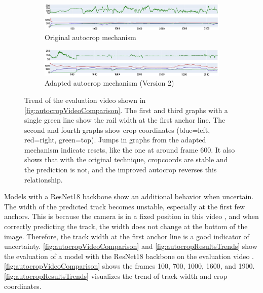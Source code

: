 \begin{figure}[H]
    \centering
    \begin{subfigure}{\textwidth}
        \centering
        \includegraphics[width=\textwidth]{PICs/experiments/autocropExperiments/original_updated.jpg} %
        \caption{Original autocrop mechanism}
        \label{fig:autocropResultsTrends_a}
    \end{subfigure}
    \begin{subfigure}{\textwidth}
        \centering
        \includegraphics[width=\textwidth]{PICs/experiments/autocropExperiments/improved_updated.jpg} %
        \caption{Adapted autocrop mechanism (Version 2)}
        \label{fig:autocropResultsTrends_b}
    \end{subfigure}
    \caption{Trend of the evaluation video \cite{temporalDataset_youtube_video} shown in \autoref{fig:autocropVideoComparison}.
    The first and third graphs with a single green line show the rail width at the first anchor line.
    The second and fourth graphs show crop coordinates (blue=left, red=right, green=top).
    Jumps in graphs from the adapted mechanism indicate resets, like the one at around frame 600.
    It also shows that with the original technique, cropcoords are stable and the prediction is not, and the improved autocrop reverses this relationship.}
    \label{fig:autocropResultsTrends}
\end{figure}


\noindent Models with a ResNet18 backbone show an additional behavior when uncertain.
The width of the predicted track becomes unstable, especially at the first few anchors.
This is because the camera is in a fixed position in this video \cite{temporalDataset_youtube_video}, and when correctly predicting the track, the width does not change at the bottom of the image.
Therefore, the track width at the first anchor line is a good indicator of uncertainty.
\autoref{fig:autocropVideoComparison} and \autoref{fig:autocropResultsTrends} show the evaluation of a model with the ResNet18 backbone on the evaluation video \cite{temporalDataset_youtube_video}.
\autoref{fig:autocropVideoComparison} shows the frames 100, 700, 1000, 1600, and 1900.
\autoref{fig:autocropResultsTrends} visualizes the trend of track width and crop coordinates.

